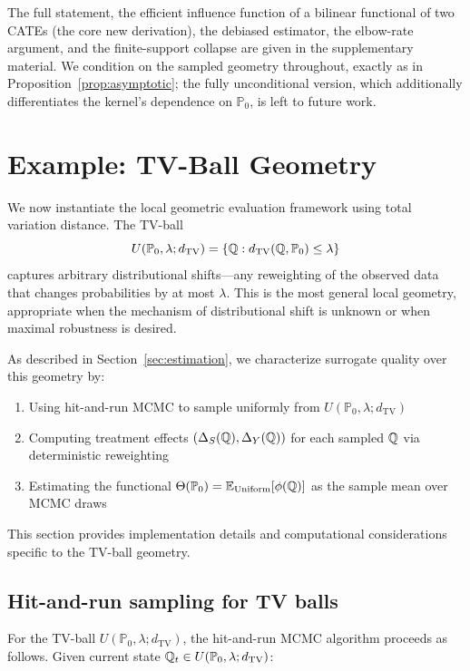 \documentclass{article}
\newcommand{\PP}{\mathbb{P}}
\begin{document}
The full statement, the efficient influence function of a bilinear functional of
two CATEs (the core new derivation), the debiased estimator, the elbow-rate
argument, and the finite-support collapse are given in the supplementary material.
We condition on the sampled geometry throughout, exactly as in
Proposition~\ref{prop:asymptotic}; the fully unconditional version, which
additionally differentiates the kernel's dependence on $\PP_0$, is left to future
work.

\section{Example: TV-Ball Geometry}\label{sec:tv-implementation}

We now instantiate the local geometric evaluation framework using total variation distance. The TV-ball
\begin{equation}
    U(\PP_0, \lambda; d_{\mathrm{TV}}) = \{\Q : d_{\mathrm{TV}}(\Q, \PP_0) \leq \lambda\}
\end{equation}
captures arbitrary distributional shifts---any reweighting of the observed data that changes probabilities by at most $\lambda$. This is the most general local geometry, appropriate when the mechanism of distributional shift is unknown or when maximal robustness is desired.

As described in Section~\ref{sec:estimation}, we characterize surrogate quality over this geometry by:
\begin{enumerate}
    \item Using hit-and-run MCMC to sample uniformly from $U(\PP_0, \lambda; d_{\mathrm{TV}})$
    \item Computing treatment effects $(\Delta_S(\mathbb{Q}), \Delta_Y(\mathbb{Q}))$ for each sampled $\mathbb{Q}$ via deterministic reweighting
    \item Estimating the functional $\Theta(\PP_0) = \E_{\text{Uniform}}[\phi(\Q)]$ as the sample mean over MCMC draws
\end{enumerate}

This section provides implementation details and computational considerations specific to the TV-ball geometry.

\subsection{Hit-and-run sampling for TV balls}

For the TV-ball $U(\PP_0, \lambda; d_{\mathrm{TV}})$, the hit-and-run MCMC algorithm proceeds as follows. Given current state $\Q_t \in U(\PP_0, \lambda; d_{\mathrm{TV}})$:
\end{document}
